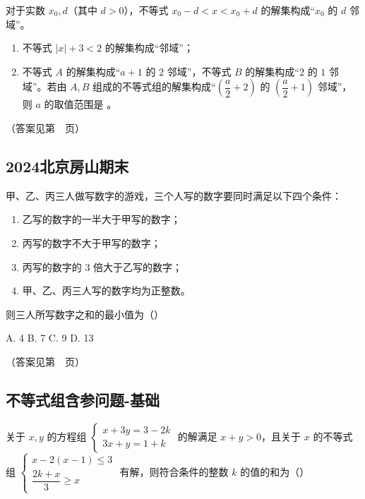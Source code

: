 对于实数 \(x_0, d\)（其中 \(d > 0\)），不等式 \(x_0 - d < x < x_0 + d\) 的解集构成“\(x_0\) 的 \(d\) 邻域”。

\begin{enumerate}
    \item 不等式 \(|x| + 3 < 2\) 的解集构成“\underline{\hspace{2cm}}邻域”；
    \vspace{5cm}
    \item 不等式 \(A\) 的解集构成“\(a+1\) 的 \(2\) 邻域”，不等式 \(B\) 的解集构成“\(2\) 的 \(1\) 邻域”。若由 \(A, B\) 组成的不等式组的解集构成“\(\left(\dfrac{a}{2}+2\right)\) 的 \(\left(\dfrac{a}{2}+1\right)\) 邻域”，则 \(a\) 的取值范围是 \underline{\hspace{2cm}}。
    \vspace{8cm} 
\end{enumerate}

（答案见第~\pageref{2025北京二中期末}~页）

\subsection{2024北京房山期末}

甲、乙、丙三人做写数字的游戏，三个人写的数字要同时满足以下四个条件：

\begin{enumerate}
    \item 乙写的数字的一半大于甲写的数字；
    \item 丙写的数字不大于甲写的数字；
    \item 丙写的数字的 3 倍大于乙写的数字；
    \item 甲、乙、丙三人写的数字均为正整数。
\end{enumerate}

则三人所写数字之和的最小值为（\quad ）

A. 4 \quad B. 7 \quad C. 9 \quad D. 13

\vspace{3cm}

（答案见第~\pageref{2024北京房山期末}~页）



\subsection{不等式组含参问题-基础}

关于 \(x, y\) 的方程组 \(\begin{cases} x + 3y = 3 - 2k \\ 3x + y = 1 + k \end{cases}\) 的解满足 \(x + y > 0\)，且关于 \(x\) 的不等式组 \(\begin{cases} x - 2(x - 1) \leq 3 \\ \dfrac{2k + x}{3} \geq x \end{cases}\) 有解，则符合条件的整数 \(k\) 的值的和为（\quad ）

